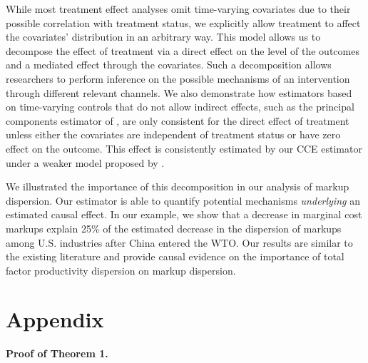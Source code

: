 \documentclass[12pt,fleqn]{article}
\begin{document}
While most treatment effect analyses omit time-varying covariates due to their possible correlation with treatment status, we explicitly allow treatment to affect the covariates' distribution in an arbitrary way. This model allows us to decompose the effect of treatment via a direct effect on the level of the outcomes and a mediated effect through the covariates. Such a decomposition allows researchers to perform inference on the possible mechanisms of an intervention through different relevant channels. We also demonstrate how estimators based on time-varying controls that do not allow indirect effects, such as the principal components estimator of \citet{chan2022pcdid}, are only consistent for the direct effect of treatment unless either the covariates are independent of treatment status or have zero effect on the outcome. This effect is consistently estimated by our CCE estimator under a weaker model proposed by \citet{Brown_Schmidt_Wooldridge_2021}. 

We illustrated the importance of this decomposition in our analysis of markup dispersion. Our estimator is able to quantify potential mechanisms \emph{underlying} an estimated causal effect. In our example, we show that a decrease in marginal cost markups explain 25\% of the estimated decrease in the dispersion of markups among U.S. industries after China entered the WTO. Our results are similar to the existing literature and provide causal evidence on the importance of total factor productivity dispersion on markup dispersion.





\pagebreak



\pagebreak

\appendix

\renewcommand{\theequation}{A.\arabic{equation}}\textbf{}

\section*{Appendix}

\noindent \textbf{Proof of Theorem 1.}

\medskip
\end{document}

